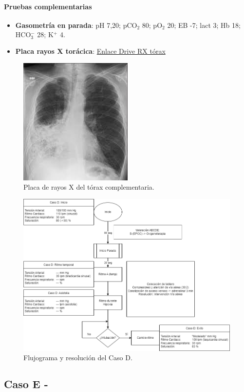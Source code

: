 \paragraph{Pruebas complementarias}
\begin{itemize}[topsep=0pt, partopsep=0pt,itemsep=0pt,parsep=0pt]
    \item \textbf{Gasometría en parada}: pH 7,20; pCO$_2$ 80; pO$_2$ 20; EB -7; lact 3; Hb 18; HCO$_3^-$ 28; K$^+$ 4.
    \item \textbf{Placa rayos X torácica}: \href{https://drive.google.com/file/d/10ItN9kxon6yGTPyf2Ivz0IKLV\_dT4vii/view?usp=share\_link}{Enlace Drive RX tórax}
\end{itemize}

\begin{figure}[hptb]
    \centering
	\includegraphics[width=0.25\linewidth]{./imagenes/UCIDoc-SVICasoDRXTorax.png}
	\caption{\label{fig:Brusilov:SVI:CasoDRXTorax}Placa de rayos X del tórax complementaria.}
\end{figure}

\begin{figure}[hptb]
    \centering
	\includegraphics[width=0.8\linewidth]{./imagenes/ACV-AdSC-CasosUCI_CasoD.png}
	\caption{\label{fig:Brusilov:SVI:CasoD}Flujograma y resolución del Caso D.}
\end{figure}

\subsection{Caso E - } %
\clearpage


